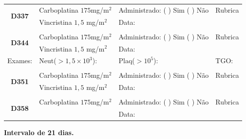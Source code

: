 \documentclass[11pt,a4paper,oldfontcommands]{memoir}
\begin{document}
\begin{center}
\begin{table}[H]
\begin{tabular}{p{1.3cm}p{4.9cm}|p{4.7cm}|p{3cm}}
    \hline
    \multicolumn{1}{c|}{\multirow{2}{*}{\textbf{D337}}}&{Carboplatina \(175\)mg/m\(^2\)}&{Administrado: (  ) Sim (  ) Não}&{Rubrica}\\
    \multicolumn{1}{c|}{}&{Vincristina \(1,5\) mg/m\(^2\)}&{Data:}&\\
    \hline
    \\
    \hline
    \multicolumn{1}{c|}{\multirow{2}{*}{\textbf{D344}}}&{Carboplatina \(175\)mg/m\(^2\)}&{Administrado: (  ) Sim (  ) Não}&{Rubrica}\\
    \multicolumn{1}{c|}{}&{Vincristina \(1,5\) mg/m\(^2\)}&{Data:}&\\
    \hline
{Exames:}&{Neut(\(>1,5\times10^3\)):}&{Plaq(\(>10^5\)):}&{TGO:}
    \\
    \hline
    \\
    \hline
    \multicolumn{1}{c|}{\multirow{2}{*}{\textbf{D351}}}&{Carboplatina \(175\)mg/m\(^2\)}&{Administrado: (  ) Sim (  ) Não}&{Rubrica}\\
    \multicolumn{1}{c|}{}&{Vincristina \(1,5\) mg/m\(^2\)}&{Data:}&\\
    \hline
    \\
        \hline
    \multicolumn{1}{c|}{\multirow{2}{*}{\textbf{D358}}}&{Carboplatina \(175\)mg/m\(^2\)}&{Administrado: (  ) Sim (  ) Não}&{Rubrica}\\
	\multicolumn{1}{c|}{}&&{Data:}&\\
    \hline
\end{tabular}
\end{table}

\textbf{Intervalo de 21 dias.}


\end{center}
\end{document}

